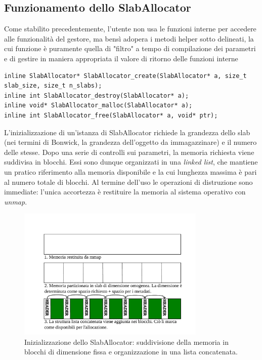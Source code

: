 \subsection*{Funzionamento dello SlabAllocator}
Come stabilito precedentemente, l’utente non usa le funzioni interne per accedere alle funzionalità del gestore, ma bensì adopera i metodi helper sotto delineati, la cui funzione è puramente quella di "filtro" a tempo di compilazione dei parametri e di gestire in maniera appropriata il valore di ritorno delle funzioni interne

\begin{lstlisting}
inline SlabAllocator* SlabAllocator_create(SlabAllocator* a, size_t slab_size, size_t n_slabs);
inline int SlabAllocator_destroy(SlabAllocator* a);
inline void* SlabAllocator_malloc(SlabAllocator* a);
inline int SlabAllocator_free(SlabAllocator* a, void* ptr);
\end{lstlisting}

L’inizializzazione di un’istanza di SlabAllocator richiede la grandezza dello slab (nei termini di Bonwick, la grandezza dell’oggetto da immagazzinare) e il numero delle stesse. Dopo una serie di controlli sui parametri, la memoria richiesta viene suddivisa in blocchi. Essi sono dunque organizzati in una \textit{linked list}, che mantiene un pratico riferimento alla memoria disponibile e la cui lunghezza massima è pari al numero totale di blocchi. Al termine dell’uso le operazioni di distruzione sono immediate: l’unica accortezza è restituire la memoria al sistema operativo con \textit{unmap}.

\begin{figure}[H]
    \centering
    \includegraphics[width=0.8\textwidth]{images/slab/slab_allocator_init.pdf}
    \caption{Inizializzazione dello SlabAllocator: suddivisione della memoria in blocchi di dimensione fissa e organizzazione in una lista concatenata.}
    \label{fig:slab_allocator_init}
\end{figure}

